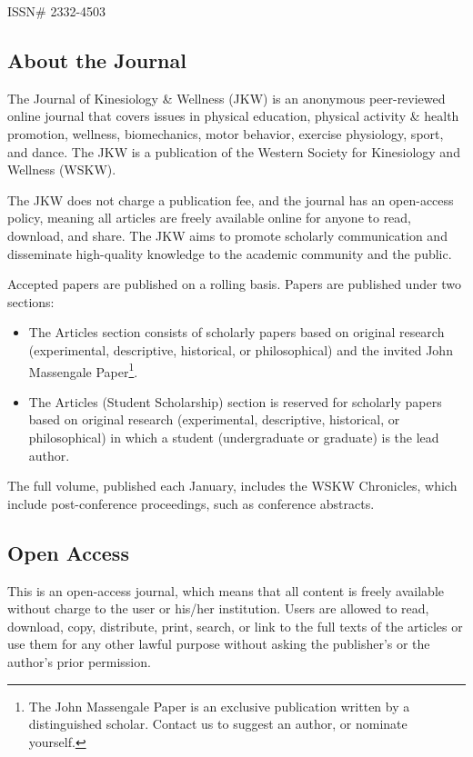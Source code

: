 \documentclass[
  letterpaper,
  DIV=11,
  numbers=noendperiod]{scrartcl}
\author{}
\date{}
\providecommand{\tightlist}{%
  \setlength{\itemsep}{0pt}\setlength{\parskip}{0pt}}
\begin{document}
ISSN\# 2332-4503


\subsection{About the Journal}\label{about-the-journal}

The Journal of Kinesiology \& Wellness (JKW) is an anonymous
peer-reviewed online journal that covers issues in physical education,
physical activity \& health promotion, wellness, biomechanics, motor
behavior, exercise physiology, sport, and dance. The JKW is a
publication of the Western Society for Kinesiology and Wellness (WSKW).

The JKW does not charge a publication fee, and the journal has an
open-access policy, meaning all articles are freely available online for
anyone to read, download, and share. The JKW aims to promote scholarly
communication and disseminate high-quality knowledge to the academic
community and the public.

Accepted papers are published on a rolling basis. Papers are published
under two sections:

\begin{itemize}
\tightlist
\item
  The Articles section consists of scholarly papers based on original
  research (experimental, descriptive, historical, or philosophical) and
  the invited John Massengale Paper\footnote{The John Massengale Paper
    is an exclusive publication written by a distinguished scholar.
    Contact us to suggest an author, or nominate yourself.}.
\item
  The Articles (Student Scholarship) section is reserved for scholarly
  papers based on original research (experimental, descriptive,
  historical, or philosophical) in which a student (undergraduate or
  graduate) is the lead author.
\end{itemize}

The full volume, published each January, includes the WSKW Chronicles,
which include post-conference proceedings, such as conference abstracts.

\subsection{Open Access}\label{open-access}

This is an open-access journal, which means that all content is freely
available without charge to the user or his/her institution. Users are
allowed to read, download, copy, distribute, print, search, or link to
the full texts of the articles or use them for any other lawful purpose
without asking the publisher's or the author's prior permission.
\end{document}

